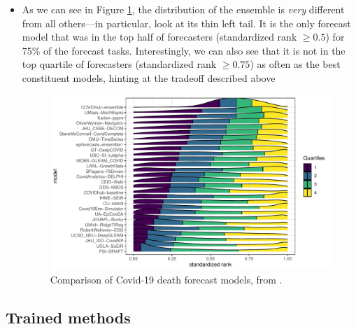 \documentclass{article}
\begin{document}
\begin{itemize}
\item As we can see in Figure \ref{fig:cramer}, the distribution of the ensemble is
  \emph{very} different from all others---in particular, look at its thin left
  tail. It is the only forecast model that was in the top half of forecasters 
  (standardized rank $\geq 0.5$) for 75\% of the forecast tasks. Interestingly,
  we can also see that it is not in the top quartile of forecasters
  (standardized rank $\geq 0.75$) as often as the best constituent models,
  hinting at the tradeoff described above  

\begin{figure}[htb]
\centering
\includegraphics[width=\textwidth]{cramer.pdf}
\caption{Comparison of Covid-19 death forecast models, from
  \citet{cramer2022evaluation}.}    
\label{fig:cramer}
\end{figure}
\end{itemize}

\subsection{Trained methods}
\end{document}
